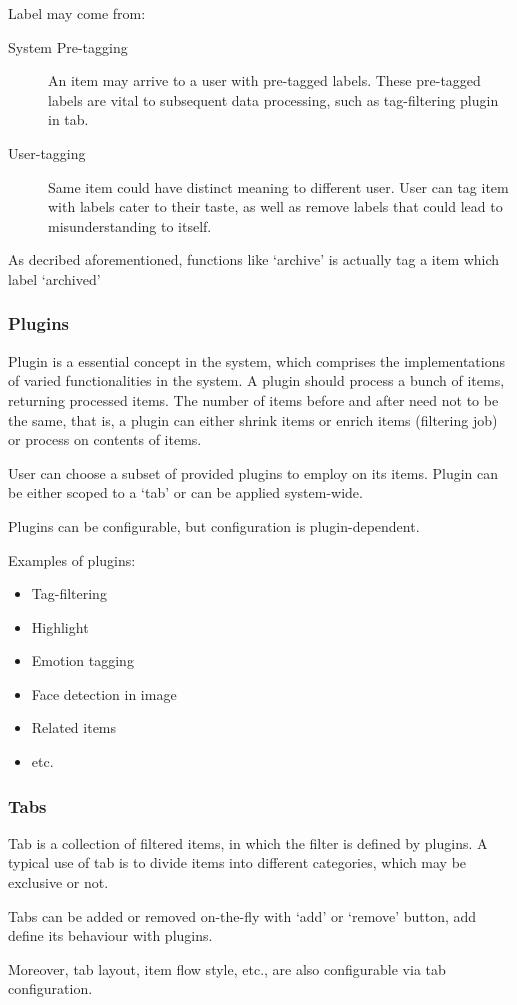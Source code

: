Label may come from:

\begin{description}
\item[System Pre-tagging]
  An item may arrive to a user with pre-tagged
  labels. These pre-tagged labels are vital to subsequent data
  processing, such as tag-filtering plugin in tab.
\item[User-tagging]
  Same item could have distinct meaning to different user.
  User can tag item with labels cater to their taste, as well as remove
  labels that could lead to misunderstanding to itself.
\end{description}

As decribed aforementioned, functions like `archive' is actually tag a
item which label `archived'

\subsubsection{Plugins}

Plugin is a essential concept in the system, which comprises the
implementations of varied functionalities in the system. A plugin should
process a bunch of items, returning processed items. The number of items
before and after need not to be the same, that is, a plugin can either
shrink items or enrich items (filtering job) or process on contents of
items.

User can choose a subset of provided plugins to employ on its items.
Plugin can be either scoped to a `tab' or can be applied system-wide.

Plugins can be configurable, but configuration is plugin-dependent.

Examples of plugins:

\begin{itemize}
\itemsep1pt\parskip0pt
\item
  Tag-filtering
\item
  Highlight
\item
  Emotion tagging
\item
  Face detection in image
\item
  Related items
\item
  etc.
\end{itemize}

\subsubsection{Tabs}

Tab is a collection of filtered items, in which the filter is defined by
plugins. A typical use of tab is to divide items into different
categories, which may be exclusive or not.

Tabs can be added or removed on-the-fly with `add' or `remove' button,
add define its behaviour with plugins.

Moreover, tab layout, item flow style, etc., are also configurable via
tab configuration.
